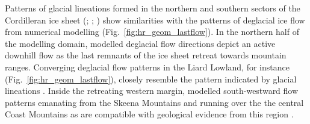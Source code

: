 \documentclass[tc, manuscript]{copernicus}
\begin{document}
      Patterns of glacial lineations formed in the northern and southern
      sectors of the Cordilleran ice sheet (\citealp{Prest.etal.1968};
      \citealp[Fig.~1.12]{Clague.1989}; \citealp[Fig.~2]{Kleman.etal.2010})
      show similarities with the patterns of deglacial ice flow from
      numerical modelling (Fig.~\ref{fig:hr_geom_lastflow}). In the northern
      half of the modelling domain, modelled deglacial flow directions
      depict an active downhill flow as the last remnants of the ice sheet
      retreat towards mountain ranges. Converging deglacial flow patterns in
      the Liard Lowland, for instance (Fig.~\ref{fig:hr_geom_lastflow}),
      closely resemble the pattern indicated by glacial lineations
      \citep[Fig.~2]{Margold.etal.2013}.
      Inside the retreating western margin, modelled south-westward flow
      patterns emanating from the Skeena Mountains and running over the the
      central Coast Mountains as are compatible with geological evidence
      from this region \citep[Fig.~12]{Stumpf.etal.2000}.
\end{document}
